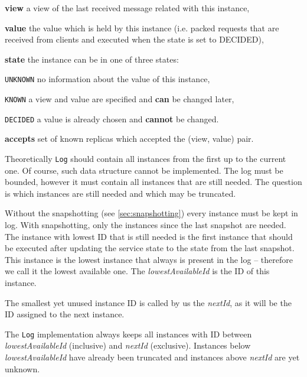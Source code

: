 \begin{tightList}[\setlength{\itemindent}{0pt}\setlength{\leftmargin}{2\leftmargin}]
  \item[\textbf{view}] a view of the last received message related with this instance,
  \item[\textbf{value}] the value which is held by this instance (i.e. packed requests that are received from clients and executed when the state is set to DECIDED), 
  \item[\textbf{state}] the instance can be in one of three states:
  \begin{tightList}[\setlength{\itemindent}{0pt} \setlength{\labelwidth}{7em}]
    \item[\texttt{\tiny UNKNOWN}] no information about the value of this instance,
    \item[\texttt{\tiny KNOWN}] a view and value are specified and \textbf{can} be changed later,
    \item[\texttt{\tiny DECIDED}] a value is already chosen and \textbf{cannot} be changed.
  \end{tightList}
  \item[\textbf{accepts}] set of known replicas which accepted the (view, value) pair.
\end{tightList}

Theoretically \texttt{Log} should contain all instances from the first up to the current one.
Of course, such data structure cannot be implemented. The log must be bounded, however it must contain all instances that are still needed. The question is which instances are still needed and which may be truncated.

Without the snapshotting (see \ref{sec:snapshotting}) every instance must be kept in log. With snapshotting, only the instances since the last snapshot are needed. The instance with lowest ID that is still needed is the first instance that should be executed after updating the service state to the state from the last snapshot. This instance is the lowest instance that always is present in the log -- therefore we call it the lowest available one. The \textit{lowestAvailableId} is the ID of this instance.

The smallest yet unused instance ID is called by us the \textit{nextId}, as it will be the ID assigned to the next instance.

The \texttt{Log} implementation always keeps all instances with ID between \textit{lowestAvailableId} (inclusive) and \textit{nextId} (exclusive). Instances below \textit{lowestAvailableId} have already been truncated and instances above \textit{nextId} are yet unknown.

